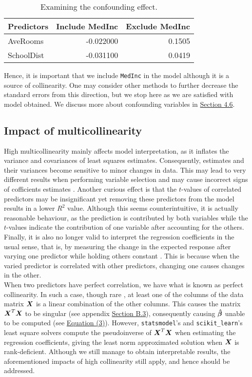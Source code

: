 \documentclass[12pt]{article}
\newcommand{\gbh}{\hat{\gb}}
\begin{document}
	\begin{table}[h]
		\centering
		\begin{tabular}{|l|rr|}
			\hline
			Predictors & Include MedInc & Exclude MedInc \\[2pt]
			\hline
			AveRooms & 	-0.022000 & 0.1505 \\[2pt]
			SchoolDist & -0.031100 & 0.0419 \\[2pt]
			\hline
		\end{tabular}       
		\label{tab:Table3}
		\caption{Examining the confounding effect.}
	\end{table}
	\pagebreak
	Hence, it is important that we include \texttt{MedInc} in the model although it is a source of collinearity. One may consider other methods to further decrease the standard errors from this direction, but we stop here as we are satisfied with model obtained. We discuss more about confounding variables in \hyperref[sec:4.6]{Section 4.6}.
	
	\subsection{Impact of multicollinearity}
	
	High multicollinearity mainly affects model interpretation, as it inflates the variance and covariances of least squares estimates. Consequently, estimates and their variances become sensitive to minor changes in data. This may lead to very different results when performing variable selection and may cause incorrect signs of cofficients estimates \cite{McClave2018}. Another curious effect is that the $t$-values of correlated predictors may be insignificant yet removing these predictors from the model results in a lower $R^2$ value. Although this seems counterintuitive, it is actually reasonable behaviour, as the prediction is contributed by both variables while the $t$-values indicate the contribution of one variable after accounting for the others. Finally, it is also no longer valid to interpret the regression coefficients in the usual sense, that is, by measuring the change in the expected response after varying one predictor while holding others constant \cite{Kutner2005}. This is because when the varied predictor is correlated with other predictors, changing one causes changes in the other. \\
	
	When two predictors have perfect correlation, we have what is known as perfect collinearity. In such a case, though rare \cite{Kutner2005}, at least one of the columns of the data matrix $\boldsymbol{X}$ is a linear combination of the other columns. This causes the matrix $\boldsymbol{X}^T\boldsymbol{X}$ to be singular (see appendix \hyperref[sec:append1]{Section B.3}), consequently causing $\boldsymbol{\gbh}$ unable to be computed (see \hyperref[eq3]{Equation (3)}). However, \texttt{statsmodel}'s and \texttt{scikit\_learn}'s least square solvers compute the pseudoinverse of $\boldsymbol{X}^T\boldsymbol{X}$ when estimating the regression coefficients, giving the least norm approximated solution when $\boldsymbol{X}$ is rank-deficient. Although we still manage to obtain interpretable results, the aforementioned impacts of high collinearity still apply, and hence should be addressed.\\
	
\end{document}
